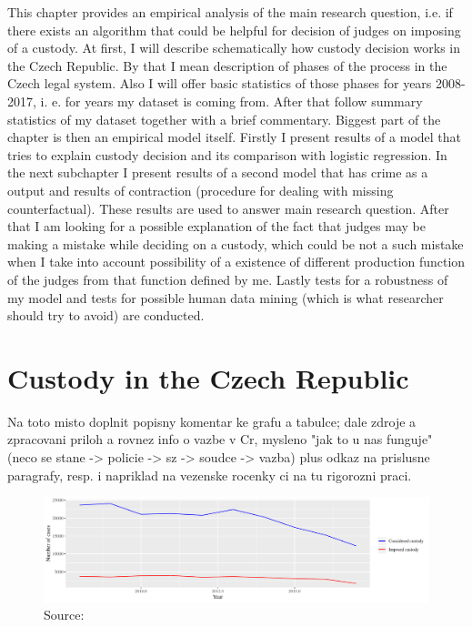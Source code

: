 \documentclass[12pt, twoside]{book} %
\begin{document}
This chapter provides an empirical analysis of the main research question, i.e. if there exists an algorithm that could be helpful for decision of judges on imposing of a custody. At first, I will describe schematically how custody decision works in the Czech Republic. By that I mean description of phases of the process in the Czech legal system. Also I will offer basic statistics of those phases for years 2008-2017, i. e. for years my dataset is coming from. After that follow summary statistics of my dataset together with a brief commentary.\newline
Biggest part of the chapter is then an empirical model itself. Firstly I present results of a model that tries to explain custody decision and its comparison with logistic regression. In the next subchapter I present results of a second model that has crime as a output and results of contraction (procedure for dealing with missing counterfactual). These results are used to answer main research question. After that I am looking for a possible explanation of the fact that judges may be making a mistake while deciding on a custody, which could be not a such mistake when I take into account possibility of a existence of different production function of the judges from that function defined by me. Lastly tests for a robustness of my model and tests for possible human data mining (which is what researcher should try to avoid) are conducted. 


\section{Custody in the Czech Republic}      %

Na toto misto doplnit popisny komentar ke grafu a tabulce; dale zdroje a zpracovani priloh a rovnez info o 
vazbe v Cr, mysleno "jak to u nas funguje" (neco se stane -> policie -> sz -> soudce -> vazba) plus odkaz na prislusne paragrafy, resp. i napriklad na vezenske rocenky ci na tu rigorozni praci. 


\begin{figure}[H]
\includegraphics[width=\textwidth]{plot_21_1.pdf}
{\small Source: }
\end{figure}
\end{document}
